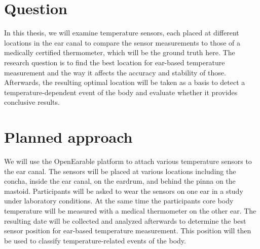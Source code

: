 
\section{Question}
In this thesis, we will examine temperature sensors, each placed at different locations in the ear canal to compare the sensor measurements to those of a medically certified thermometer, which will be the ground truth here. The research question is to find the best location for ear-based temperature measurement and the way it affects the accuracy and stability of those. Afterwards, the resulting optimal location will be taken as a basis to detect a temperature-dependent event of the body and evaluate whether it provides conclusive results.




\section{Planned approach}
We will use the OpenEarable platform to attach various temperature sensors to the ear canal. The sensors will be placed at various locations including the concha, inside the ear canal, on the eardrum, and behind the pinna on the mastoid. Participants will be asked to wear the sensors on one ear in a study under laboratory conditions.
At the same time the participants core body temperature will be measured with a medical thermometer on the other ear.
The resulting date will be collected and analyzed afterwards to determine the best sensor position for ear-based temperature measurement. This position will then be used to classify temperature-related events of the body.

